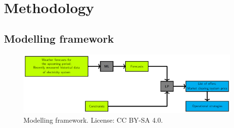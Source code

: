\hypertarget{methodology}{%
\section{Methodology}\label{methodology}}

\hypertarget{modelling-framework}{%
\subsection{Modelling framework}\label{modelling-framework}}

\begin{figure}
\centering
\includegraphics{images/model_framework.png}
\caption{Modelling framework. License: CC BY-SA 4.0.}
\end{figure}
